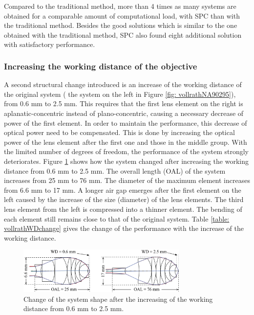 Compared to the traditional method, more than 4 times as many systems are obtained for a comparable amount of computational load, with SPC than with the traditional method. Besides the good solutions which is similar to the one obtained with the traditional method, SPC also found eight additional solution with satisfactory performance. 

\subsubsection{Increasing the working distance of the objective}
A second structural change introduced is an increase of the working distance of the original system ( the system on the left in Figure \ref{fig: vollrathNA90295}), from 0.6 mm to 2.5 mm. This requires that the first lens element on the right is aplanatic-concentric instead of plano-concentric, causing a necessary decrease of power of the first element. In order to maintain the performance, this decrease of optical power need to be compensated. This is done by increasing the optical power of the lens element after the first one and those in the middle group. With the limited number of degrees of freedom, the performance of the system strongly deteriorates. Figure \ref{fig: vollrathWD06to25} shows how the system changed after increasing the working distance from 0.6 mm to 2.5 mm. The overall length (OAL) of the system increases from 25 mm to 76 mm. The diameter of the maximum element increases from 6.6 mm to 17 mm. A longer air gap emerges after the first element on the left caused by the increase of the size (diameter) of the lens elements. The third lens element from the left is compressed into a thinner element. The bending of each element still remains close to that of the original system. Table \ref{table: vollrathWDchange} gives the change of the performance with the increase of the working distance. 

\begin{figure}[h!]
    \centering
    \includegraphics[width=0.75\textwidth]{chapter-4/figures/Vollrath_WD06TO25.png}
    \caption{Change of the system shape after the increasing of the working distance from 0.6 mm to 2.5 mm.}
    \label{fig: vollrathWD06to25}
\end{figure}

